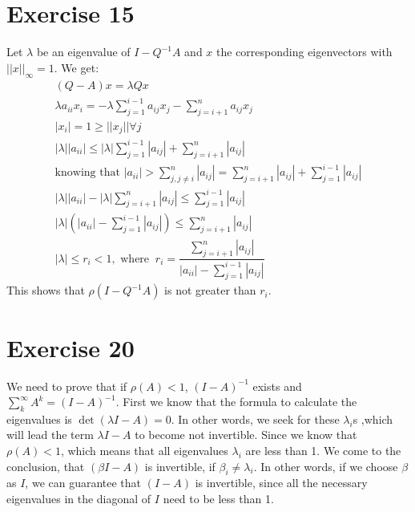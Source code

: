 \section{Exercise 15}
Let $\lambda$ be an eigenvalue of $ I - Q^{-1}A$ and $x$ the corresponding eigenvectors with $||x||_{\infty} = 1$.
We get:
\begin{gather*}
\left( Q -A \right) x = \lambda Q x  \\
\lambda a_{ii}x_i = - \lambda \sum\limits_{j=1}^{i-1} a_{ij}x_{j} - \sum\limits_{j=i+1}^{n} a_{ij}x_j \\
|x_i| = 1 \geq ||x_j|| \forall j\\
|\lambda | |a_{ii}| \leq  |\lambda| \sum\limits_{j=1}^{i-1} |a_{ij}| + \sum\limits_{j=i+1}^{n} |a_{ij}| \\
\text{knowing that } |a_{ii}| > \sum\limits_{j,j \neq i}^n |a_{ij}| = \sum\limits_{j=i+1}^{n} |a_{ij}| + \sum\limits_{j=1}^{i-1} |a_{ij}| \\
|\lambda| |a_{ii}| - |\lambda| \sum\limits_{j=i+1}^{n} |a_{ij}| \leq \sum\limits_{j=1}^{i-1} |a_{ij}|  \\
|\lambda| ( |a_{ii}| - \sum\limits_{j=1}^{i-1} |a_{ij}| ) \leq \sum\limits_{j=i+1}^{n} |a_{ij}|
\\ 
|\lambda| \leq r_i < 1 , \text{ where }\ 
r_i = \dfrac{ \sum\limits_{j=i+1}^{n} |a_{ij}| }{ |a_{ii}| - \sum\limits_{j=1}^{i-1} |a_{ij}| }
\end{gather*}
This shows that $\rho(I-Q^{-1}A)$ is not greater than $r_i$.

\section{Exercise 20}
We need to prove that if $\rho(A) < 1$, $(I-A)^{-1}$ exists and $\sum\limits_k^\infty A^k = (I-A)^{-1}$.
First we know that the formula to calculate the eigenvalues is $\det ( \lambda I - A) =0$. In other words, we seek for these $\lambda_i$s ,which will lead the term $\lambda I -A$ to become not invertible. Since we know that $\rho (A) < 1$, which means that all eigenvalues $\lambda_i$ are less than 1. We come to the conclusion, that $(\beta I - A)$ is invertible, if $\beta_i \neq \lambda_i$. In other words, if we choose $\beta$ as $I$, we can guarantee that $(I-A)$ is invertible, since all the necessary eigenvalues in the diagonal of $I$ need to be less than 1.

